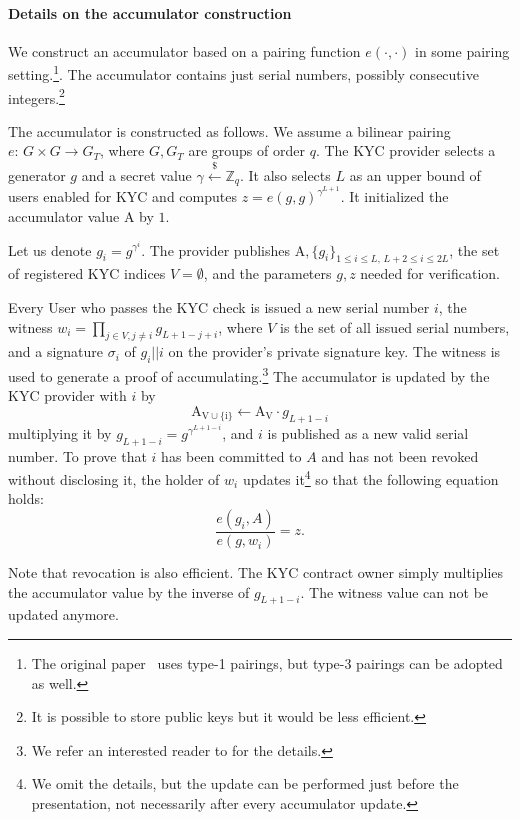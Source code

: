 \paragraph{Details on the accumulator construction}
We construct an accumulator based on a pairing function $e(\cdot,\cdot)$ in some pairing setting.\footnote{The original paper~\cite{Camenisch2009} uses type-1 pairings, but type-3 pairings can be adopted as well.}.
The accumulator contains just serial numbers, possibly consecutive integers.\footnote{It is possible to store public keys but it would be less efficient.}

The accumulator is constructed as follows.
We assume a bilinear pairing $e:\,G\times G\rightarrow G_T$, where $G,G_T$ are groups of order $q$.
The KYC provider selects a generator $g$ and a secret value $\gamma\overset{\$}{\leftarrow} \mathbb{Z}_q$.
It also selects $L$ as an upper bound of users enabled for KYC and computes $z = e(g,g)^{\gamma^{L+1}}$.
It initialized the accumulator value $\mathrm{A}$ by $1$. 

Let us denote $g_i = g^{\gamma^i}$.
The provider publishes $\mathrm{A},\{g_i\}_{1\leq i\leq L, \,L+2\leq i \leq 2L}$, the set of registered KYC indices $V=\emptyset$, and the parameters $g,z$ needed for verification.

Every User who passes the KYC check is issued a new serial number $i$, the witness $w_i = \prod_{j\in V,j\neq i} g_{L+1-j+i}$, where $V$ is the set of all issued serial numbers, and a signature $\sigma_i$ of $g_i||i$ on the provider's private signature key.
The witness is used to generate a proof of accumulating.\footnote{We refer an interested reader to \cite{Camenisch2009} for the details.}
The accumulator is updated by the KYC provider with $i$ by
$$
\mathrm{A_{V\cup\{i\}}} \leftarrow \mathrm{A_V} \cdot g_{L+1-i}
$$
multiplying it by $g_{L+1-i} = g^{\gamma^{L+1-i}}$, and $i$ is published as a new valid serial number.
To prove that $i$ has been committed to $A$ and has not been revoked without disclosing it, the holder of $w_i$ updates it\footnote{We omit the details, but the update can be performed just before the presentation, not necessarily after every accumulator update.} so that the following equation holds:
$$
\frac{e(g_i, A)}{e(g,w_i)} = z.
$$

Note that revocation is also efficient.
The KYC contract owner simply multiplies the accumulator value by the inverse of $g_{L+1-i}$.
The witness value can not be updated anymore.

